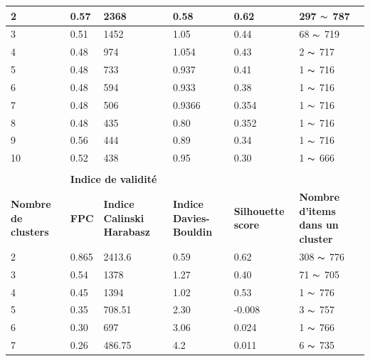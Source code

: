 \begin{table}[H]
\begin{tabular}{|m{2cm}|m{2cm}|m{2cm}|m{2cm}|m{2cm}|m{3cm}|}
	2  & \cellcolor{gray!40} 0.57 & \cellcolor{gray!40} 2368 & \cellcolor{gray!40} 0.58   & \cellcolor{gray!40} 0.62    &  297  \(\displaystyle \thicksim  \)  787  \\ \hline 	
	3  & 0.51 & 1452 & 1.05   & 0.44    &  68   \(\displaystyle \thicksim  \)  719  \\ \hline
	4  & 0.48 & 974  & 1.054  & 0.43    &  2    \(\displaystyle \thicksim  \)  717  \\ \hline
	5  & 0.48 & 733  & 0.937  & 0.41    &  1    \(\displaystyle \thicksim  \)  716  \\ \hline
	6  & 0.48 & 594  & 0.933  & 0.38    &  1    \(\displaystyle \thicksim  \)  716  \\ \hline
	7  & 0.48 & 506  & 0.9366 & 0.354   &  1    \(\displaystyle \thicksim  \)  716  \\ \hline
	8  & 0.48 & 435  & 0.80   & 0.352   &  1    \(\displaystyle \thicksim  \)  716  \\ \hline
	9  & 0.56 & 444  & 0.89   & 0.34    &  1    \(\displaystyle \thicksim  \)  716  \\ \hline
	10 & 0.52 & 438  & 0.95   & 0.30    &  1    \(\displaystyle \thicksim  \)  666  \\ \hline \hline
	\rowcolor{blueforest}
	\multicolumn{6}{|m{16cm}|}{\centering \color{white} \textbf{Fuzzy clustering} } \\ \hline
	&  \multicolumn{4}{|m{8cm}|}{\centering \textbf{Indice de validité} } & \\ \hline
	\textbf{Nombre de clusters}  &   \textbf{FPC} & \textbf{Indice Calinski Harabasz}& \textbf{Indice Davies-Bouldin} & \textbf{Silhouette score}  &  \textbf{Nombre d'items dans un cluster }\\ \hline
	2  & \cellcolor{gray!40} 0.865 & \cellcolor{gray!40} 2413.6  & \cellcolor{gray!40} 0.59   &  \cellcolor{gray!40} 0.62    &  308 \(\displaystyle \thicksim  \)  776  \\ \hline 	
	3  & 0.54  & 1378    & 1.27   &  0.40    &  71  \(\displaystyle \thicksim  \)  705 \\ \hline
	4  & 0.45  & 1394    & 1.02   &  0.53    &  1   \(\displaystyle \thicksim  \)  776 \\ \hline
	5  & 0.35  & 708.51  & 2.30   &  -0.008  &  3   \(\displaystyle \thicksim  \)  757 \\ \hline
	6  & 0.30  & 697     & 3.06   &  0.024   &  1   \(\displaystyle \thicksim  \)  766 \\ \hline
	7  & 0.26  & 486.75  & 4.2    &  0.011   &  6   \(\displaystyle \thicksim  \)  735 \\ \hline

\end{tabular}
\end{table}
